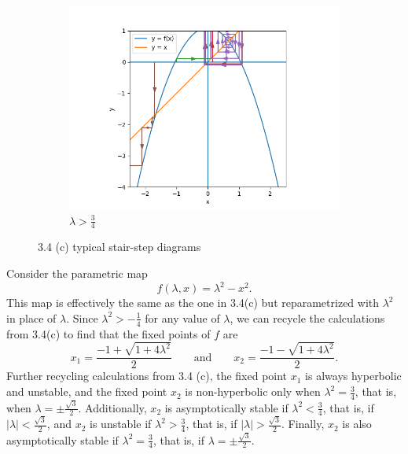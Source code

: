 \documentclass[nonumber]{homework}
\begin{document}
\begin{figure}[h]
\begin{subfigure}{.33\textwidth}
			\includegraphics[width=\linewidth]{3.4c lambda gt 34.png}
			\caption{$\lambda > \frac{3}{4}$}
			\label{fig:3.4cgt34}
		\end{subfigure}
		\caption{3.4 (c) typical stair-step diagrams}
		\label{fig:3.4c}
	\end{figure}
	
	\clearpage
	\newpage
	\mbox{}
	
	
	Consider the parametric map
	\begin{equation*}
		f(\lambda, x) = \lambda^2 - x^2.
	\end{equation*}
	This map is effectively the same as the one in 3.4(c) but reparametrized with $\lambda^2$ in place of $\lambda$. Since $\lambda^2 > -\frac{1}{4}$ for any value of $\lambda$, we can recycle the calculations from 3.4(c) to find that the fixed points of $f$ are
	\begin{equation*}
		x_1 = \frac{-1 + \sqrt{1+4\lambda^2}}{2} \qquad\text{and}\qquad x_2 = \frac{-1-\sqrt{1+4\lambda^2}}{2}.
	\end{equation*}
	Further recycling calculations from 3.4 (c), the fixed point $x_1$ is always hyperbolic and unstable, and the fixed point $x_2$ is non-hyperbolic only when $\lambda^2 = \frac{3}{4}$, that is, when $\lambda = \pm \frac{\sqrt{3}}{2}$. Additionally, $x_2$ is asymptotically stable if $\lambda^2 < \frac{3}{4}$, that is, if $|\lambda| < \frac{\sqrt{3}}{2}$, and $x_2$ is unstable if $\lambda^2 > \frac{3}{4}$, that is, if $|\lambda| > \frac{\sqrt{3}}{2}$. Finally, $x_2$ is also asymptotically stable if $\lambda^2 = \frac{3}{4}$, that is, if $\lambda = \pm\frac{\sqrt{3}}{2}$.
	
\end{document}
